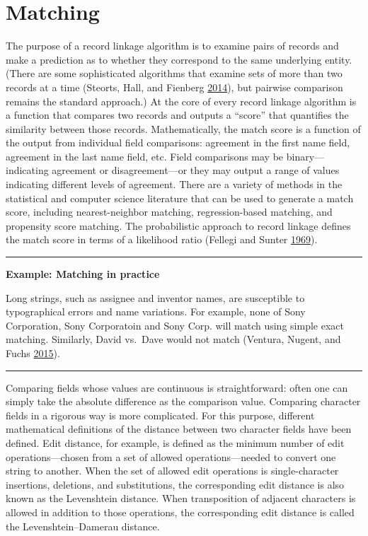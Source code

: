 \documentclass[]{krantz}
\begin{document}
\section{Matching}\label{matching}

The purpose of a record linkage algorithm is to examine pairs of records
and make a prediction as to whether they correspond to the same
underlying entity. (There are some sophisticated algorithms that examine
sets of more than two records at a time (Steorts, Hall, and Fienberg
\protect\hyperlink{ref-steorts2014smered}{2014}), but pairwise
comparison remains the standard approach.) At the core of every record
linkage algorithm is a function that compares two records and outputs a
``score'' that quantifies the similarity between those records.
Mathematically, the match score is a function of the output from
individual field comparisons: agreement in the first name field,
agreement in the last name field, etc. Field comparisons may be
binary---indicating agreement or disagreement---or they may output a
range of values indicating different levels of agreement. There are a
variety of methods in the statistical and computer science literature
that can be used to generate a match score, including nearest-neighbor
matching, regression-based matching, and propensity score matching. The
probabilistic approach to record linkage defines the match score in
terms of a likelihood ratio (Fellegi and Sunter
\protect\hyperlink{ref-FS69}{1969}).

\begin{center}\rule{0.5\linewidth}{\linethickness}\end{center}

\textbf{Example: Matching in practice}

Long strings, such as assignee and inventor names, are susceptible to
typographical errors and name variations. For example, none of Sony
Corporation, Sony Corporatoin and Sony Corp. will match using simple
exact matching. Similarly, David vs.~Dave would not match (Ventura,
Nugent, and Fuchs \protect\hyperlink{ref-ventura2015seeing}{2015}).

\begin{center}\rule{0.5\linewidth}{\linethickness}\end{center}

Comparing fields whose values are continuous is straightforward: often
one can simply take the absolute difference as the comparison value.
Comparing character fields in a rigorous way is more complicated. For
this purpose, different mathematical definitions of the distance between
two character fields have been defined. Edit distance, for example, is
defined as the minimum number of edit operations---chosen from a set of
allowed operations---needed to convert one string to another. When the
set of allowed edit operations is single-character insertions,
deletions, and substitutions, the corresponding edit distance is also
known as the Levenshtein distance. When transposition of adjacent
characters is allowed in addition to those operations, the corresponding
edit distance is called the Levenshtein--Damerau distance.
\end{document}
